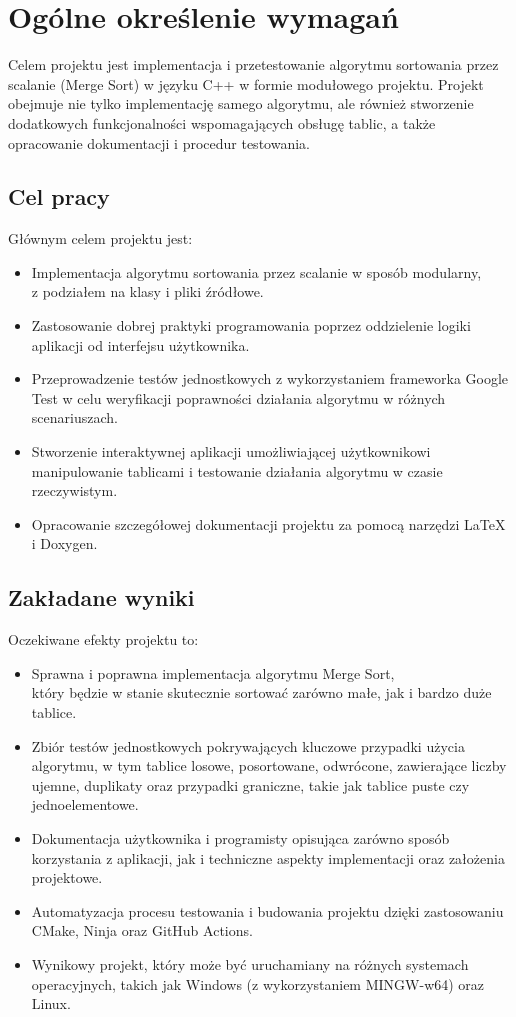 \section{Ogólne określenie wymagań}
\label{sec:ogolne-wymagania}

Celem projektu jest implementacja i przetestowanie algorytmu sortowania przez scalanie (Merge Sort) w języku C++ w formie modułowego projektu.
Projekt obejmuje nie tylko implementację samego algorytmu, ale również stworzenie dodatkowych funkcjonalności wspomagających obsługę tablic,
a także opracowanie dokumentacji i procedur testowania.

\subsection{Cel pracy}
Głównym celem projektu jest:
\begin{itemize}
  \item Implementacja algorytmu sortowania przez scalanie w sposób modularny, \\ z podziałem na klasy i pliki źródłowe.
  \item Zastosowanie dobrej praktyki programowania poprzez oddzielenie logiki aplikacji od interfejsu użytkownika.
  \item Przeprowadzenie testów jednostkowych z wykorzystaniem frameworka Google Test w celu weryfikacji poprawności działania algorytmu w różnych scenariuszach.
  \item Stworzenie interaktywnej aplikacji umożliwiającej użytkownikowi manipulowanie tablicami i testowanie działania algorytmu w czasie rzeczywistym.
  \item Opracowanie szczegółowej dokumentacji projektu za pomocą narzędzi LaTeX i Doxygen.
\end{itemize}

\subsection{Zakładane wyniki}
Oczekiwane efekty projektu to:
\begin{itemize}
  \item Sprawna i poprawna implementacja algorytmu Merge Sort, \\ który będzie w stanie skutecznie sortować zarówno małe, jak i bardzo duże tablice.
  \item Zbiór testów jednostkowych pokrywających kluczowe przypadki użycia algorytmu, w tym tablice losowe, posortowane, odwrócone, zawierające liczby ujemne, duplikaty oraz przypadki graniczne, takie jak tablice puste czy jednoelementowe.
  \item Dokumentacja użytkownika i programisty opisująca zarówno sposób korzystania z aplikacji, jak i techniczne aspekty implementacji oraz założenia projektowe.
  \item Automatyzacja procesu testowania i budowania projektu dzięki zastosowaniu CMake, Ninja oraz GitHub Actions.
  \item Wynikowy projekt, który może być uruchamiany na różnych systemach operacyjnych, takich jak Windows (z wykorzystaniem MINGW-w64) oraz Linux.
\end{itemize}

